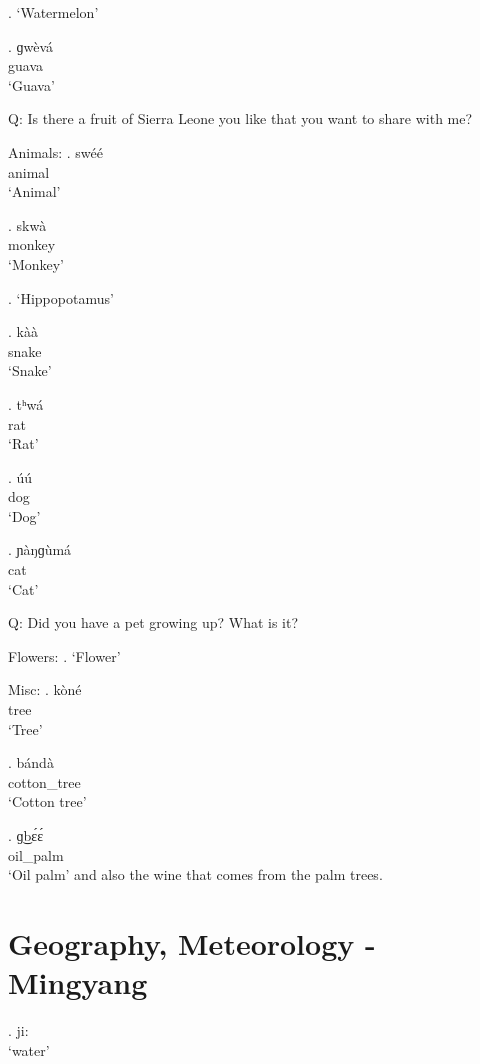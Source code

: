 \documentclass{assets/fieldnotes}
\begin{document}
\ex. `Watermelon'

\exg. ɡwèvá\\
guava\\
`Guava'

Q: Is there a fruit of Sierra Leone you like that you want to share with me?

Animals:
\exg. swéé\\
animal\\
`Animal'


\exg. skwà\\
monkey\\
`Monkey'\\

\ex. `Hippopotamus'

\exg. kàà\\
snake\\
`Snake'

\exg. tʰwá\\
rat\\
`Rat'

\exg. úú\\
dog\\
`Dog'\\

\exg. ɲàŋɡùmá\\
cat\\
`Cat'

Q: Did you have a pet growing up? What is it?

Flowers: 
\ex. `Flower'


Misc:
\exg. kòné\\
tree\\
`Tree'

\exg. bándà\\
cotton\_tree\\
`Cotton tree'

\exg. ɡ͜bɛ́ɛ́\\
oil\_palm\\
`Oil palm' and also the wine that comes from the palm trees.

\section{Geography, Meteorology - Mingyang} 
    \ex. ji:\\
        `water'
        
\end{document}
